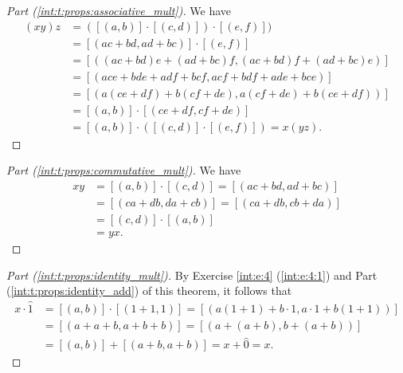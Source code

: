 \begin{proof}[Part (\ref{int:t:props:associative_mult})]
	We have
	\begin{align*}
		(xy)z & = ([(a, b)] \cdot [(c, d)]) \cdot [(e, f)])            \\
		      & = [(ac + bd, ad + bc)] \cdot [(e, f)]                  \\
		      & = [((ac + bd)e + (ad + bc)f, (ac + bd)f + (ad + bc)e)] \\
		      & = [(ace + bde + adf + bcf, acf + bdf + ade + bce)]     \\
		      & = [(a(ce + df) + b(cf + de), a(cf + de) + b(ce + df))] \\
		      & = [(a, b)] \cdot [(ce + df, cf + de)]                  \\
		      & = [(a, b)] \cdot ([(c, d)] \cdot [(e, f)]) = x(yz).
	\end{align*}
\end{proof}

\begin{proof}[Part (\ref{int:t:props:commutative_mult})]
	We have
	\begin{align*}
		xy & = [(a, b)] \cdot [(c, d)] = [(ac + bd, ad + bc)] \\
		   & = [(ca + db, da + cb)] = [(ca + db, cb + da)]    \\
		   & = [(c, d)] \cdot [(a, b)]                        \\
		   & = yx.
	\end{align*}
\end{proof}

\begin{proof}[Part (\ref{int:t:props:identity_mult})]
	By Exercise \ref{int:e:4} (\ref{int:e:4:1}) and Part (\ref{int:t:props:identity_add}) of this theorem, it follows that
	\begin{align*}
		x \cdot \hat{1} & = [(a, b)] \cdot [(1 + 1, 1)] = [(a(1 + 1) + b \cdot 1, a \cdot 1 + b(1 + 1))] \\
		                & = [(a + a + b, a + b + b)] = [(a + (a + b), b + (a + b))]                      \\
		                & = [(a, b)] + [(a + b, a + b)] = x + \hat{0} = x.
	\end{align*}
\end{proof}

